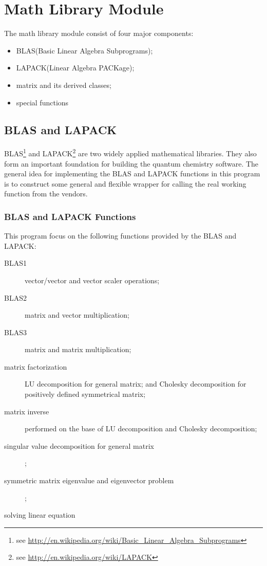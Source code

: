 %
%
\chapter{Math Library Module}
%
%
%
The math library module consist of four major components:
\begin{itemize}
 \item BLAS(Basic Linear Algebra Subprograms);
 \item LAPACK(Linear Algebra PACKage);
 \item matrix and its derived classes;
 \item special functions
\end{itemize}

\section{BLAS and LAPACK}
%
%
BLAS\footnote{see \url{http://en.wikipedia.org/wiki/Basic_Linear_Algebra_Subprograms}} 
and LAPACK\footnote{see \url{http://en.wikipedia.org/wiki/LAPACK}} are two widely 
applied mathematical libraries. They also form an important foundation for building the 
quantum chemistry software. The general idea for implementing the BLAS and LAPACK
functions in this program is to construct some general and flexible wrapper for 
calling the real working function from the vendors.

\subsection{BLAS and LAPACK Functions}
%
%
%
This program focus on the following functions provided by the BLAS and 
LAPACK:
\begin{description}
 \item [BLAS1] vector/vector and vector scaler operations;
 \item [BLAS2] matrix and vector multiplication;
 \item [BLAS3] matrix and matrix multiplication;
 \item [matrix factorization] LU decomposition for general matrix;
 and Cholesky decomposition for positively defined symmetrical matrix;
 \item [matrix inverse] performed on the base of LU decomposition and Cholesky 
 decomposition;
 \item [singular value decomposition for general matrix];
 \item [symmetric matrix eigenvalue and eigenvector problem];
 \item [solving linear equation]
\end{description}

